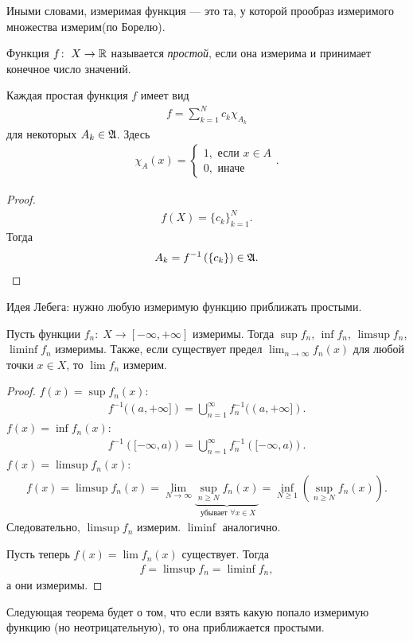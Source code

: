 Иными словами, измеримая функция --- это та, у которой прообраз измеримого множества измерим(по Борелю).
\begin{df}
 Функция $f \colon\; X \to \mathbb{R}$ называется \textit{простой}, если она измерима и принимает конечное число значений.
\end{df}
\begin{remrk}
 Каждая простая функция $f$ имеет вид
 \begin{align*}
  f = \sum_{k=1}^{N} c_k \chi_{A_k}
 \end{align*} для некоторых $A_k \in \mathfrak{A}$. Здесь
 \begin{align*}
  \chi_A(x) = \begin{cases}
   1, \text{ если } x \in A \\
   0, \text{ иначе }
  \end{cases}
 .\end{align*}
\end{remrk}
\begin{proof}
 \begin{align*}
  f(X) = \{c_{k}\}_{k=1}^{N}
 .\end{align*} Тогда
 \begin{align*}
  A_k = f^{-1} \left( \left\{ c_k \right\} \right) \in \mathfrak{A}
 .\end{align*}
\end{proof}
Идея Лебега: нужно любую измеримую функцию приближать простыми.
\begin{lm}
 Пусть функции $f_n \colon\; X \to [-\infty, +\infty]$ измеримы. Тогда $\sup f_n$, $\inf f_n$,  $\limsup f_n$, $\liminf f_n$ измеримы. Также, если существует предел  $\lim_{n \to \infty} f_n(x)$ для любой точки $x \in X$, то $\lim f_n$ измерим.
\end{lm}
\begin{proof}
 $f(x) = \sup f_n(x)$:
 \begin{align*}
  f^{-1}((a, +\infty]) = \bigcup_{n=1}^{\infty} f^{-1}_n( (a, +\infty] )
 .\end{align*} $f(x) = \inf f_n(x)$:
 \begin{align*}
  f^{-1} \left( [-\infty, a) \right) = \bigcup_{n=1}^{\infty} f^{-1}_n \left( [-\infty, a) \right)
 .\end{align*}  $f(x) = \limsup f_n(x)$:
 \begin{align*}
  f(x) = \limsup f_n(x) = \displaystyle\lim_{N \to \infty} \underbrace{\sup_{n \geqslant N} f_n(x)}_{\text{ убывает } \forall x \in X} = \inf_{N \geqslant 1} \left( \sup_{n \geqslant N} f_n(x) \right)
 .\end{align*} Следовательно, $\limsup f_n$ измерим. $\liminf$ аналогично.

 Пусть теперь $f(x) = \lim f_n(x)$ существует. Тогда
 \begin{align*}
  f = \limsup f_n = \liminf f_n
 ,\end{align*} а они измеримы.
\end{proof}

Следующая теорема будет о том, что если взять какую попало измеримую функцию (но неотрицательную), то она приближается простыми.

